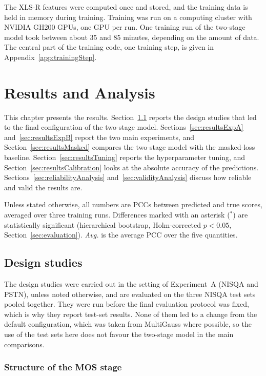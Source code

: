 \documentclass[
english,                 %
bibtex,                  %
includeExtraAbstracts, %
]{kththesis}
\numberwithin{listing}{chapter}
\begin{document}
The XLS-R features were computed once and stored, and the training data is held in memory during training. Training was run on a computing cluster with NVIDIA GH200 GPUs, one GPU per run. One training run of the two-stage model took between about 35 and 85 minutes, depending on the amount of data. The central part of the training code, one training step, is given in Appendix~\ref{app:trainingStep}.

\cleardoublepage
\chapter{Results and Analysis}
\label{ch:resultsAndAnalysis}

This chapter presents the results. Section~\ref{sec:designStudyResults} reports the design studies that led to the final configuration of the two-stage model. Sections~\ref{sec:resultsExpA} and~\ref{sec:resultsExpB} report the two main experiments, and Section~\ref{sec:resultsMasked} compares the two-stage model with the masked-loss baseline. Section~\ref{sec:resultsTuning} reports the hyperparameter tuning, and Section~\ref{sec:resultsCalibration} looks at the absolute accuracy of the predictions. Sections~\ref{sec:reliabilityAnalysis} and~\ref{sec:validityAnalysis} discuss how reliable and valid the results are.

Unless stated otherwise, all numbers are \glspl{PCC} between predicted and true scores, averaged over three training runs. Differences marked with an asterisk ($^{*}$) are statistically significant (hierarchical bootstrap, Holm-corrected $p < 0.05$, Section~\ref{sec:evaluation}). \emph{Avg.} is the average PCC over the five quantities.

\section{Design studies}
\label{sec:designStudyResults}

The design studies were carried out in the setting of Experiment~A (NISQA and PSTN), unless noted otherwise, and are evaluated on the three NISQA test sets pooled together. They were run before the final evaluation protocol was fixed, which is why they report test-set results. None of them led to a change from the default configuration, which was taken from MultiGauss where possible, so the use of the test sets here does not favour the two-stage model in the main comparisons.

\subsection{Structure of the MOS stage}
\end{document}
